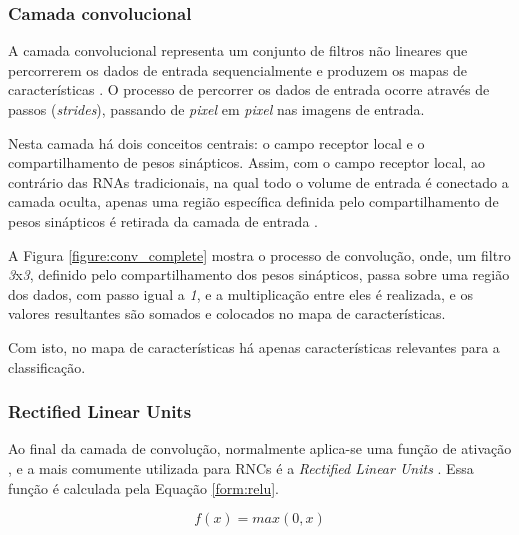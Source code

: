 \subsubsection{Camada convolucional}

\par A camada convolucional representa um conjunto de filtros não lineares que percorrerem os dados de entrada sequencialmente e produzem os mapas de características \cite{Miyazaki2017}. O processo de percorrer os dados de entrada ocorre através de passos (\textit{strides}), passando de \textit{pixel} em \textit{pixel} nas imagens de entrada.

\par Nesta camada há dois conceitos centrais: o campo receptor local e o compartilhamento de pesos sinápticos. Assim, com o campo receptor local, ao contrário das RNAs tradicionais, na qual todo o volume de entrada é conectado a camada oculta, apenas uma região específica definida pelo compartilhamento de pesos sinápticos é retirada da camada de entrada \cite{mnielsen2018}.

\par A Figura \ref{figure:conv_complete} mostra o processo de convolução, onde, um filtro \textit{3}x\textit{3}, definido pelo compartilhamento dos pesos sinápticos, passa sobre uma região dos dados, com passo igual a \textit{1}, e a multiplicação entre eles é realizada, e os valores resultantes são somados e colocados no mapa de características.


\par Com isto, no mapa de características há apenas características relevantes para a classificação.

\subsubsection{Rectified Linear Units}

\par Ao final da camada de convolução, normalmente aplica-se uma função de ativação \cite{Carneiro2017}, e a mais comumente utilizada para RNCs é a \textit{Rectified Linear Units} \cite{nair2010, Krizhevsky2012}. Essa função é calculada pela Equação \ref{form:relu}.

\begin{equation}
    f(x) = max(0, x)
\label{form:relu}
\end{equation}

